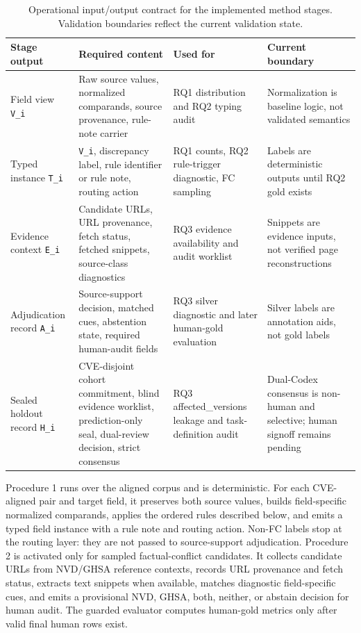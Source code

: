 \begin{table}[!htbp]
\centering
\setlength{\tabcolsep}{3pt}
\footnotesize
\caption{Operational input/output contract for the implemented method stages. Validation boundaries reflect the current validation state.}
\label{tab:03-method-operational-input-output-contract-1}
\begin{tabularx}{\textwidth}{>{\raggedright\arraybackslash}p{}>{\raggedright\arraybackslash}X>{\raggedright\arraybackslash}X>{\raggedright\arraybackslash}X}
\toprule
Stage output & Required content & Used for & Current boundary \\
\midrule
Field view \texttt{V\_i} & Raw source values, normalized comparands, source provenance, rule-note carrier & RQ1 distribution and RQ2 typing audit & Normalization is baseline logic, not validated semantics \\
Typed instance \texttt{T\_i} & \texttt{V\_i}, discrepancy label, rule identifier or rule note, routing action & RQ1 counts, RQ2 rule-trigger diagnostic, FC sampling & Labels are deterministic outputs until RQ2 gold exists \\
Evidence context \texttt{E\_i} & Candidate URLs, URL provenance, fetch status, fetched snippets, source-class diagnostics & RQ3 evidence availability and audit worklist & Snippets are evidence inputs, not verified page reconstructions \\
Adjudication record \texttt{A\_i} & Source-support decision, matched cues, abstention state, required human-audit fields & RQ3 silver diagnostic and later human-gold evaluation & Silver labels are annotation aids, not gold labels \\
Sealed holdout record \texttt{H\_i} & CVE-disjoint cohort commitment, blind evidence worklist, prediction-only seal, dual-review decision, strict consensus & RQ3 affected\_versions leakage and task-definition audit & Dual-Codex consensus is non-human and selective; human signoff remains pending \\
\bottomrule
\end{tabularx}
\end{table}

Procedure 1 runs over the aligned corpus and is deterministic. For each CVE-aligned pair and target field, it preserves both source values, builds field-specific normalized comparands, applies the ordered rules described below, and emits a typed field instance with a rule note and routing action. Non-FC labels stop at the routing layer: they are not passed to source-support adjudication. Procedure 2 is activated only for sampled factual-conflict candidates. It collects candidate URLs from NVD/GHSA reference contexts, records URL provenance and fetch status, extracts text snippets when available, matches diagnostic field-specific cues, and emits a provisional NVD, GHSA, both, neither, or abstain decision for human audit. The guarded evaluator computes human-gold metrics only after valid final human rows exist.

